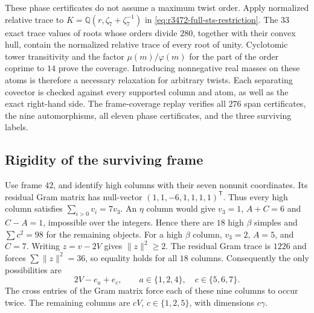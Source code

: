 These phase certificates do not assume a maximum twist order. Apply
normalized relative trace to
$K=\mathbb Q(r,\zeta_7+\zeta_7^{-1})$ in
\eqref{eq:r3472-full-sts-restriction}. The $33$ exact trace values of
roots whose orders divide $280$, together with their convex hull, contain
the normalized relative trace of every root of unity. Cyclotomic tower
transitivity and the factor $\mu(m)/\varphi(m)$ for the part of the
order coprime to $14$ prove the coverage. Introducing nonnegative real
masses on these atoms is therefore a necessary relaxation for arbitrary
twists. Each separating covector is checked against every supported
column and atom, as well as the exact right-hand side. The frame-coverage
replay verifies all $276$ span certificates, the nine automorphisms,
all eleven phase certificates, and the three surviving labels.

\subsection{Rigidity of the surviving frame}
Use frame $42$, and identify high columns with their seven nonunit
coordinates. Its residual Gram matrix has null-vector
$(1,1,-6,1,1,1,1)^{\mathsf T}$. Thus every high column satisfies
$\sum_{i>0}v_i=7v_3$. An $\eta$ column would give $v_3=1$,
$A+C=6$ and $C-A=1$, impossible over the integers. Hence there are
$18$ high $\beta$ simples and $\sum c^2=98$ for the remaining objects.
For a high $\beta$ column, $v_3=2$, $A=5$, and $C=7$.
Writing $z=v-2V$ gives $\|z\|^2\geq2$. The residual Gram trace is
$1226$ and forces $\sum\|z\|^2=36$, so equality holds for all
$18$ columns. Consequently the only possibilities are
\[
 2V-e_a+e_c,\qquad a\in\{1,2,4\},\quad c\in\{5,6,7\}.
\]
The cross entries of the Gram matrix force each of these nine columns to
occur twice. The remaining columns are $cV$, $c\in\{1,2,5\}$,
with dimensions $c\gamma$.

